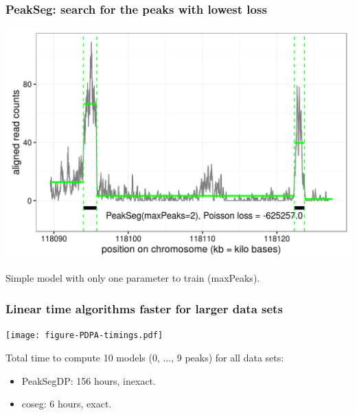 \documentclass{beamer}
\begin{document}
\begin{frame}
  \frametitle{PeakSeg: search for the peaks with lowest loss}
  \includegraphics[width=1\textwidth]{figure-macs-problem-PeakSeg.png}
  
  Simple model with only one parameter to train (maxPeaks).
\end{frame}

\begin{frame}
  \frametitle{Linear time algorithms faster for larger data sets}
  \texttt{[image: figure-PDPA-timings.pdf]}

  Total time to compute 10 models (0, ..., 9 peaks) for all data sets:
  \begin{itemize}
  \item PeakSegDP: 156 hours, inexact.
  \item coseg: 6 hours, exact.
  \end{itemize}
\end{frame}
\end{document}
